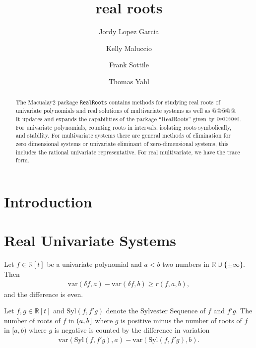 \documentclass[12pt]{amsart}
\title{real roots}
\author[J.~Lopez Garcia]{Jordy Lopez Garcia}
\author[K.~Maluccio]{Kelly Maluccio}
\author[F.~Sottile]{Frank Sottile}
\author[T.~Yahl]{Thomas Yahl}
\theoremstyle{definition}
\begin{document}
%
%

\begin{abstract}
The Macualay2 package \texttt{RealRoots} contains methods for studying real roots of univariate polynomials and real solutions of multivariate systems as well as @@@@@. It updates and expands the capabilities of the package ``RealRoots'' given by @@@@@. For univariate polynomials, counting roots in intervals, isolating roots symbolically, and stability. For multivariate systems there are general methods of elimination for zero dimensional systems or univariate eliminant of zero-dimensional systems, this includes the rational univariate representative. For real multivariate, we have the trace form. 
\end{abstract}

\maketitle


\section*{Introduction}


\section{Real Univariate Systems}
Let $f\in \mathbb{R}[t]$ be a univariate polynomial and $a<b$ two numbers in $\mathbb{R}\cup\{\pm\infty\}$. Then 
\begin{align*}
\text{var}(\delta f,a) - \text{var}(\delta f,b) \geq r(f,a,b),
\end{align*}
and the difference is even. 

\theorem[Sylvester]
Let $f,g\in\mathbb{R}[t]$ and $\text{Syl}(f,f'g)$ denote the Sylvester Sequence of $f$ and $f'g$. The number of roots of $f$ in $(a,b\hspace{.05cm}]$ where $g$ is positive minus the number of roots of $f$ in $[a,b)$ where $g$ is negative is counted by the difference in variation
\begin{align*}
\text{var}(\text{Syl}(f,f'g),a) - \text{var}(\text{Syl}(f,f'g),b).
\end{align*}
\end{document}
